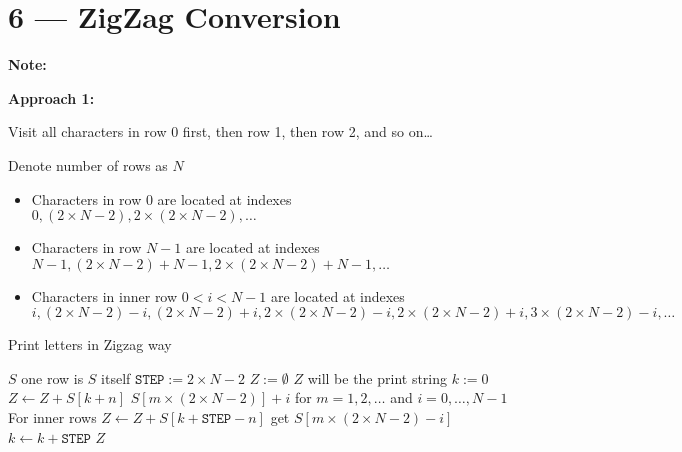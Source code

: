 \documentclass[a4paper,12pt]{article}
\begin{document}
\section{6 --- ZigZag Conversion}
\textbf{\large{Note:}}
\par
\vspace{0.5em}
\noindent
\textbf{Approach 1:}
\par
\noindent
Visit all characters in row 0 first, then row 1, then row 2, and so on\dots
\par
\noindent
Denote number of rows as $N$
\begin{itemize}
\item Characters in row $0$ are located at indexes $0, \left(2 \times N - 2\right), 2\times\left(2 \times N - 2\right), \ldots$
\item Characters in row $N-1$ are located at indexes $N-1, \left(2 \times N - 2\right) + N - 1, 2\times\left(2 \times N - 2\right) + N - 1, \ldots$
\item Characters in inner row $0<i<N-1$ are located at indexes 
\[
i, \left(2 \times N - 2\right)-i, \left(2 \times N - 2\right) + i, 2\times\left(2 \times N - 2\right)- i, 2\times\left(2 \times N - 2\right)+ i, 3\times\left(2 \times N - 2\right)- i, \dots
\]
\end{itemize}
\setcounter{algorithm}{0}
\begin{algorithm}[H]
\caption{Print letters in Zigzag way}
\begin{algorithmic}[1]
\Statex
{}
\State \Return $S$ \Comment one row is $S$ itself
\EndIf
\State $\mathtt{STEP} := 2 \times N -2$
\State $Z:= \emptyset$ \Comment $Z$ will be the print string
\State $k:= 0$
\State $Z \gets Z + S[k+n]$ \Comment $S[m\times \left(2 \times N - 2\right)] + i$ for $m = 1,2, \ldots$ and $i = 0, \ldots, N-1$
 \Comment For inner rows
\State $Z \gets Z + S[k+\mathtt{STEP}-n]$ \Comment get $S[m\times\left(2 \times N - 2\right)- i]$
\EndIf
\State $k \gets k+\mathtt{STEP}$
\EndWhile
\EndFor
\State \Return $Z$
\EndProcedure
\Statex
\end{algorithmic}
\end{algorithm}
\end{document}
